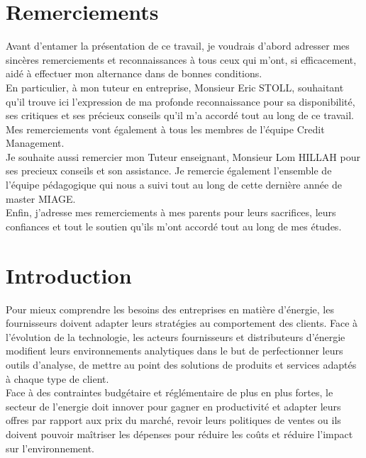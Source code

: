 \documentclass[11pt,a4paper]{report}
\begin{document}
\section*{Remerciements}
\thispagestyle{empty}
Avant d’entamer la présentation de ce travail, je voudrais d’abord adresser mes sincères remerciements et reconnaissances à tous ceux qui m’ont, si efficacement, aidé à effectuer
mon alternance dans de bonnes conditions.\\

En particulier, à mon tuteur en entreprise, Monsieur Eric STOLL, souhaitant qu’il trouve ici l’expression de ma profonde reconnaissance pour sa disponibilité, ses critiques et ses précieux conseils qu’il m’a accordé tout au long de ce travail.
Mes remerciements vont également à tous les membres de l’équipe Credit Management.\\

Je souhaite aussi remercier mon Tuteur enseignant, Monsieur Lom HILLAH pour ses precieux conseils et son assistance. Je   remercie également l’ensemble de l’équipe pédagogique qui nous a suivi tout au long de cette dernière année de master MIAGE.\\

Enfin, j'adresse mes remerciements à mes parents pour leurs sacrifices, leurs confiances et tout le soutien qu'ils m'ont accordé tout au long  de mes études. \\


\newpage
\setcounter{page}{1}
\section*{Introduction}

Pour mieux comprendre les besoins des  entreprises en matière d'énergie, les fournisseurs doivent adapter leurs stratégies au comportement des clients. Face à l'évolution de la technologie, les acteurs fournisseurs et distributeurs d'énergie modifient leurs environnements analytiques dans le but de perfectionner leurs outils d'analyse, de mettre au point des solutions de produits et services  adaptés à chaque type de client.\\

Face à des contraintes budgétaire et réglémentaire de plus en plus fortes, le secteur de l'energie doit innover pour gagner en productivité et adapter leurs offres par rapport aux prix du marché, revoir leurs politiques de ventes ou ils doivent pouvoir maîtriser les dépenses pour réduire les coûts et réduire l'impact sur l'environnement. \\
\end{document}
